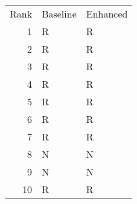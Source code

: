 \begin{tabular}{rll}
Rank & Baseline & Enhanced \\
1 & R & R \\
2 & R & R \\
3 & R & R \\
4 & R & R \\
5 & R & R \\
6 & R & R \\
7 & R & R \\
8 & N & N \\
9 & N & N \\
10 & R & R \\
\end{tabular}
